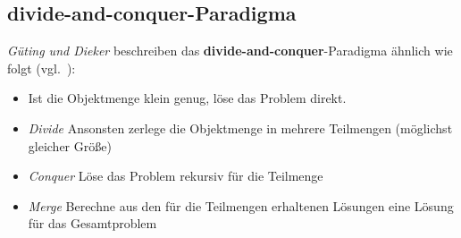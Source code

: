 \subsection{divide-and-conquer-Paradigma}

\textit{Güting und Dieker} beschreiben das \textbf{divide-and-conquer}-Paradigma ähnlich wie folgt (vgl.~\cite[174]{GD18e}):
\begin{itemize}
    \item Ist die Objektmenge klein genug, löse das Problem direkt.
    \item \textit{Divide} Ansonsten zerlege die Objektmenge in mehrere Teilmengen (möglichst gleicher Größe)
    \item \textit{Conquer} Löse das Problem rekursiv für die Teilmenge
    \item \textit{Merge} Berechne aus den für die Teilmengen erhaltenen Lösungen eine Lösung für das Gesamtproblem
\end{itemize}
